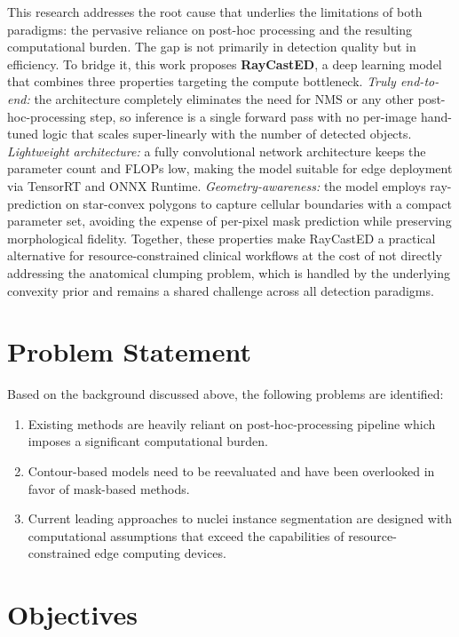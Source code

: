 This research addresses the root cause that underlies the limitations of both paradigms: the pervasive reliance on post-hoc processing and the resulting computational burden. The gap is not primarily in detection quality but in efficiency. To bridge it, this work proposes \textbf{RayCastED}, a deep learning model that combines three properties targeting the compute bottleneck. \textit{Truly end-to-end:} the architecture completely eliminates the need for NMS or any other post-hoc-processing step, so inference is a single forward pass with no per-image hand-tuned logic that scales super-linearly with the number of detected objects. \textit{Lightweight architecture:} a fully convolutional network architecture keeps the parameter count and FLOPs low, making the model suitable for edge deployment via TensorRT and ONNX Runtime. \textit{Geometry-awareness:} the model employs ray-prediction on star-convex polygons to capture cellular boundaries with a compact parameter set, avoiding the expense of per-pixel mask prediction while preserving morphological fidelity. Together, these properties make RayCastED a practical alternative for resource-constrained clinical workflows at the cost of not directly addressing the anatomical clumping problem, which is handled by the underlying convexity prior and remains a shared challenge across all detection paradigms.

\section{Problem Statement}

Based on the background discussed above, the following problems are identified:

\begin{enumerate}
	\item Existing methods are heavily reliant on post-hoc-processing pipeline which imposes a significant computational burden.

	\item Contour-based models need to be reevaluated and have been overlooked in favor of mask-based methods.
	
	\item Current leading approaches to nuclei instance segmentation are designed with computational assumptions that exceed the capabilities of resource-constrained edge computing devices.
\end{enumerate}

\section{Objectives}

